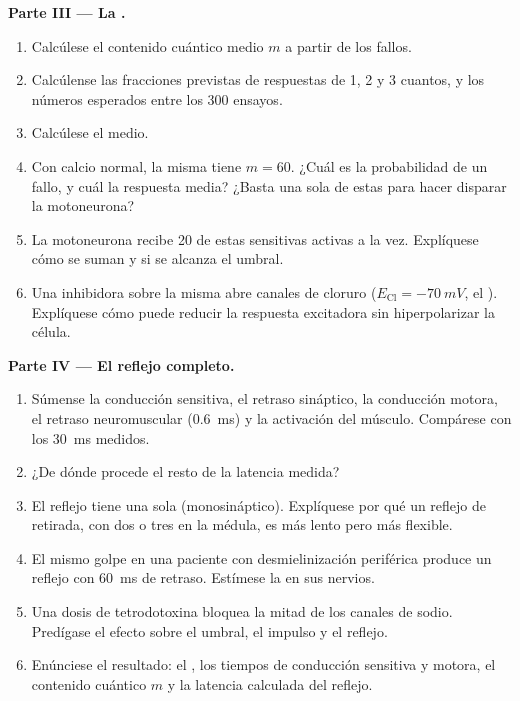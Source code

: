 \begin{problem}
\medskip
\noindent\textbf{Parte III --- La .}
\begin{enumerate}[resume]
  \item Calcúlese el contenido cuántico medio $m$ a partir de los fallos.
  \item Calcúlense las fracciones previstas de respuestas de 1, 2 y 3
        cuantos, y los números esperados entre los 300 ensayos.
  \item Calcúlese el  medio.
  \item Con calcio normal, la misma  tiene $m = 60$. ¿Cuál es la
        probabilidad de un fallo, y cuál la respuesta media? ¿Basta una
        sola de estas  para hacer disparar la motoneurona?
  \item La motoneurona recibe \num{20} de estas  sensitivas
        activas a la vez. Explíquese cómo se suman y si se alcanza el
        umbral.
  \item Una  inhibidora sobre la misma  abre canales de
        cloruro ($E_{\mathrm{Cl}} = \qty{-70}{mV}$, el ). Explíquese cómo puede reducir la respuesta excitadora sin
        hiperpolarizar la célula.
\end{enumerate}

\medskip
\noindent\textbf{Parte IV --- El reflejo completo.}
\begin{enumerate}[resume]
  \item Súmense la conducción sensitiva, el retraso sináptico, la
        conducción motora, el retraso neuromuscular (\qty{0.6}{ms}) y la
        activación del músculo. Compárese con los \qty{30}{ms} medidos.
  \item ¿De dónde procede el resto de la latencia medida?
  \item El reflejo tiene una sola  (monosináptico). Explíquese
        por qué un reflejo de retirada, con dos o tres  en la
        médula, es más lento pero más flexible.
  \item El mismo golpe en una paciente con desmielinización periférica
        produce un reflejo con \qty{60}{ms} de retraso. Estímese la
         en sus nervios.
  \item Una dosis de tetrodotoxina bloquea la mitad de los canales de
        sodio. Predígase el efecto sobre el umbral, el impulso y el
        reflejo.
  \item Enúnciese el resultado: el , los tiempos de
        conducción sensitiva y motora, el contenido cuántico $m$ y la
        latencia calculada del reflejo.
\end{enumerate}
\end{problem}
